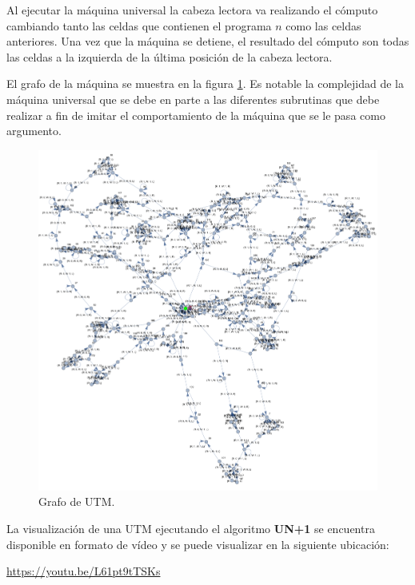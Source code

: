 \documentclass[10pt,a4paper]{article}
\begin{document}
Al ejecutar la máquina universal la cabeza lectora va realizando el cómputo cambiando tanto las celdas que contienen el programa $n$ como las celdas anteriores. Una vez que la máquina se detiene, el resultado del cómputo son todas las celdas a la izquierda de la última posición de la cabeza lectora.

El grafo de la máquina se muestra en la figura \ref{fig:utmGraph}. Es notable la complejidad de la máquina universal que se debe en parte a las diferentes subrutinas que debe realizar a fin de imitar el comportamiento de la máquina que se le pasa como argumento.

\begin{figure}[h!tb!]
	\centering
	\includegraphics[scale=0.42]{../img/utm_graph.pdf}
	\caption{Grafo de UTM.}
	\label{fig:utmGraph}
\end{figure}

La visualización de una UTM ejecutando el algoritmo \textbf{UN+1} se encuentra disponible en formato de vídeo y se puede visualizar en la siguiente ubicación:

\url{https://youtu.be/L61pt9tTSKs}

\clearpage
\end{document}
